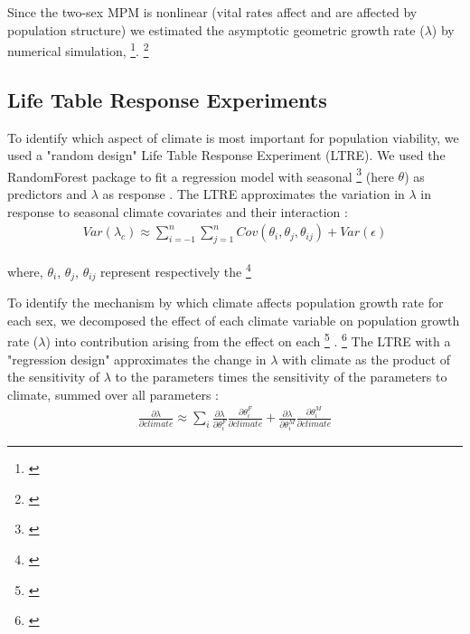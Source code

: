 \documentclass[12pt]{article}\usepackage[]{graphicx}\usepackage[dvipsnames]{xcolor}
\newcommand{\tom}[2]{{\color{red}{#1}}\footnote{\textit{\color{red}{#2}}}}
\begin{document}
Since the two-sex MPM is nonlinear (vital rates affect and are affected by population structure) we estimated the asymptotic geometric growth rate ($\lambda$) by numerical simulation, \tom{and repeated this across a range of climate}{Vague - needs more detail.}.
\tom{}{Too much of this section is familiar to me from the Am Nat paper. I suggest you write this in your own voice. You also should provide an explanation for the female-dominant model.}

\subsection*{Life Table Response Experiments}
To identify which aspect of climate is most important for population viability, we used a "random design" Life Table Response Experiment (LTRE). 
We used the RandomForest package to fit a regression model with seasonal \tom{climate}{It is unclear what variation in climate you are sampling over.} (here $\theta$) as predictors  and $\lambda$ as response \citep{ellner2016data,liaw2002classification}.
The LTRE approximates the variation in $\lambda$ in response to seasonal climate covariates and their interaction \citep{caswell2000matrix,hernandez2023exact}:
\begin{align}\label{eq:ltre}
Var(\lambda_{c})\approx \sum_{i=-1}^{n}\sum_{j=1}^{n} Cov(\theta_{i},\theta_{j},\theta_{ij}) + Var (\epsilon)
\end{align}

\noindent where, $\theta_{i}$, $\theta_{j}$, $\theta_{ij}$  represent respectively the \tom{fitted regression slope for the covariates of the dormant season,j the covariates of the growing season and ij the covariates of their interactions.}{But you also have second-order terms, and I am not sure whether and how this LTRE accounts for that. Also, what is $n$ here? Why does the summation over i start at -1? And why do you show only two variables, since you have four?} 

To identify the mechanism by which climate affects population growth rate for each sex, we decomposed the effect of each climate variable on population growth rate ($\lambda$) into contribution arising from the effect on each \tom{stage-specific vital rate}{I don't know what you mean by ``stage-specific''} \citep{caswell2000matrix}.
\tom{At this end we used another LTRE with a "regression design".}{I think you need greater clarification about what different information you get out of the two LTREs, and how they relate to the motivating biological questions. I understand this, of course, but I think readers will be confused.} 
The LTRE with a "regression design" approximates the change in $\lambda$ with climate as the product of the sensitivity of $\lambda$ to the parameters times the sensitivity of the parameters to climate, summed over all parameters \citep{caswell1989analysis}:
\begin{align}\label{eq:ltresex}
\frac{\partial \lambda}{\partial climate} \approx \sum_{i} \frac{\partial \lambda}{\partial \theta^{F}_{i}} \frac{\partial \theta^{F}_{i}}{\partial climate} + \frac{\partial \lambda}{\partial \theta^{M}_{i}} \frac{\partial \theta^{M}_{i}}{\partial climate}
\end{align}
\end{document}
